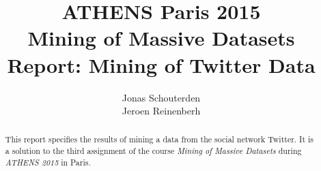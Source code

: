 \documentclass[10pt,a4paper]{report}
\author{Jonas Schouterden\\
Jeroen Reinenberh}
\title{ATHENS Paris 2015\\
Mining of Massive Datasets\\
Report: Mining of Twitter Data}
\begin{document}
\maketitle
\begin{abstract}
This report specifies the results of mining a data from the social network Twitter. It is a solution to the third assignment of the course \emph{Mining of Massive Datasets} during \emph{ATHENS 2015} in Paris.
\end{abstract}
\end{document}
